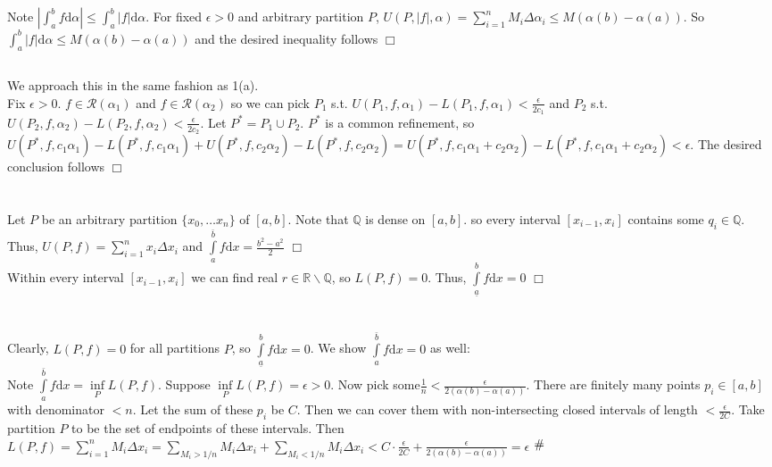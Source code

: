 \documentclass{article}
\newcommand{\contra}{\raisebox{\depth}{\#}}
\begin{document}
\subsection{}
Note $\left| \int_a^b f\mathrm{d}\alpha \right| \leq \int_a^b |f|\mathrm{d}\alpha$. For fixed $\epsilon > 0$ and arbitrary partition $P$, $U(P,|f|,\alpha) = \sum\limits_{i=1}^n M_i\Delta \alpha_i \leq M(\alpha(b) - \alpha(a))$. So $\int_a^b |f|\mathrm{d}\alpha \leq M(\alpha(b) - \alpha(a))$ and the desired inequality follows $\Box$

\subsection{}
We approach this in the same fashion as 1(a).\\
Fix $\epsilon > 0$. $f\in \mathcal{R}(\alpha_1)$ and $f\in \mathcal{R}(\alpha_2)$ so we can pick $P_1$ s.t. $U(P_1,f,\alpha_1) - L(P_1,f,\alpha_1) < \frac{\epsilon}{2c_1}$ and $P_2$ s.t. $U(P_2,f,\alpha_2) - L(P_2,f,\alpha_2) < \frac{\epsilon}{2c_2}$. Let $P^* = P_1 \cup P_2$. $P^*$ is a common refinement, so $U(P^*,f,c_1\alpha_1) - L(P^*,f,c_1\alpha_1) + U(P^*,f,c_2\alpha_2) - L(P^*,f,c_2\alpha_2) = U(P^*,f,c_1\alpha_1+c_2\alpha_2) - L(P^*,f,c_1\alpha_1+c_2\alpha_2) < \epsilon$. The desired conclusion follows $\Box$

\section{}
Let $P$ be an arbitrary partition $\{x_0,\dots x_n\}$ of $[a,b]$. Note that $\mathbb{Q}$ is dense on $[a,b]$. so every interval $[x_{i-1},x_i]$ contains some $q_i \in \mathbb{Q}$. Thus, $U(P,f) = \sum\limits_{i = 1}^n {x_i \Delta x_i}$ and $\int\limits_a^{\bar{b}} f \mathrm{d}x = \frac{b^2-a^2}{2}$ $\Box$
\\
Within every interval $[x_{i-1},x_i]$ we can find real $r \in \mathbb{R}\backslash \mathbb{Q}$, so $L(P,f) = 0$. Thus, $\int\limits_{\underline{a}}^{b} f \mathrm{d}x = 0$ $\Box$

\section{}
Clearly, $L(P,f) = 0$ for all partitions $P$, so $\int\limits_{\underline{a}}^{b} f \mathrm{d}x = 0$. We show $\int\limits_a^{\bar{b}} f \mathrm{d}x = 0$ as well:\\
Note $\int\limits_a^{\bar{b}} f \mathrm{d}x = \inf\limits_P L(P,f)$. Suppose $\inf\limits_P L(P,f) = \epsilon > 0$. Now pick some$\frac{1}{n} < \frac{\epsilon}{2(\alpha(b) - \alpha (a))}$. There are finitely many points $p_i \in [a,b]$ with denominator $<n$. Let the sum of these $p_i$ be $C$. Then we can cover them with non-intersecting closed intervals of length $< \frac{\epsilon}{2C}$. Take partition $P$ to be the set of endpoints of these intervals. Then $L(P,f) = \sum\limits_{i=1}^n M_i \Delta x_i = \sum\limits_{M_i > 1/n} M_i\Delta x_i + \sum\limits_{M_i < 1/n} M_i\Delta x_i  < C\cdot \frac{\epsilon}{2C} + \frac{\epsilon}{2(\alpha(b) - \alpha(a))} = \epsilon$ $\contra$
\end{document}

